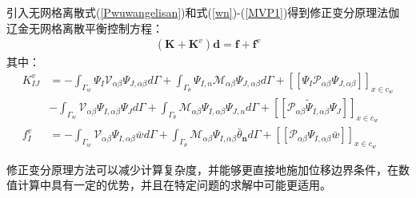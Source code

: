 引入无网格离散式(\ref{Pwuwangelisan})和式(\ref{wn})-(\ref{MVP1})得到修正变分原理法伽辽金无网格离散平衡控制方程：
\begin{equation}
\begin{split}
    (\pmb{K}+\pmb{K}^v)\pmb{d}=\pmb{f}+\pmb{f}^v
\end{split}
\end{equation}
其中：
\begin{equation}
\begin{split}
     K^v_{IJ}&=-\int_{\Gamma_w}\Psi_I\mathcal{V}_{\alpha\beta}\Psi_{J,\alpha\beta}d\Gamma+\int_{\Gamma_{\theta}}\Psi_{I,n}\mathcal{M}_{\alpha\beta}\Psi_{J,\alpha\beta}d\Gamma+[[\Psi_I\mathcal{P}_{\alpha\beta}\Psi_{J,\alpha\beta}]]_{x\in{c_w}}\\
     &-\int_{\Gamma_w}\mathcal{V}_{\alpha\beta}\Psi_{I,\alpha\beta}\Psi_Jd\Gamma+\int_{\Gamma_{\theta}}\mathcal{M}_{\alpha\beta}\Psi_{I,\alpha\beta}\Psi_{J,n}d\Gamma+[[\mathcal{P}_{\alpha\beta}\tilde{\Psi}_{I,\alpha\beta}\Psi_J]]_{x\in{c_w}}\\
     f_{I}^v&=-\int_{\Gamma_w}\mathcal{V}_{\alpha\beta}\Psi_{I,\alpha\beta}\bar{w}d\Gamma+\int_{\Gamma_{\theta}}\mathcal{M}_{\alpha\beta}\Psi_{I,\alpha\beta}\bar{\theta}_{\pmb n}d\Gamma+[[\mathcal{P}_{\alpha\beta}\Psi_{I,\alpha\beta}\bar{w}]]_{x\in{c_w}}
\end{split}
\end{equation}\par
修正变分原理方法可以减少计算复杂度，并能够更直接地施加位移边界条件，在数值计算中具有一定的优势，并且在特定问题的求解中可能更适用。
